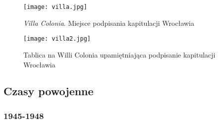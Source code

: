\documentclass[12pt]{article}
\begin{document}
\begin{figure}[h]
    \centering
    \texttt{[image: villa.jpg]}
    \caption{\textit{Villa Colonia}. Miejsce podpisania kapitulacji Wrocławia}
    \label{fig:villa}
\end{figure}
\begin{figure}[h]
    \centering
    \texttt{[image: villa2.jpg]}
    \caption{Tablica na Willi Colonia upamiętniająca podpisanie kapitulacji Wrocławia}
    \label{fig:villa2}
\end{figure}

\subsection{Czasy powojenne}

\subsubsection{1945-1948}
\end{document}
